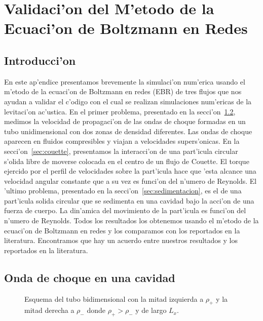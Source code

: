 \chapter{Validaci'on del M'etodo de la Ecuaci'on de Boltzmann en Redes}



\section{Introducci'on}

En este ap'endice presentamos brevemente la simulaci'on num'erica 
usando el m'etodo de la ecuaci'on de Boltzmann en redes (EBR) de  tres
flujos que nos ayudan a validar el c'odigo con el cual se realizan simulaciones num'ericas
de la levitaci'on ac'ustica.
En el primer problema, presentado en la secci'on~\ref{sec:hugoniot}, medimos la velocidad de propagaci'on de 
las ondas de choque formadas en un tubo unidimensional con dos zonas de densidad diferentes. Las
ondas de choque aparecen en fluidos compresibles y viajan a velocidades supers'onicas.
En la secci'on~\ref{sec:couette}, presentamos la interacci'on de una part'icula circular s'olida
libre de moverse colocada en  el centro de un flujo de Couette. El torque ejercido
por el perfil de velocidades sobre la part'icula hace que 'esta alcance una velocidad
angular constante que a su vez es funci'on del n'umero de Reynolds.
El 'ultimo problema, presentado en la secci'on~\ref{sec:sedimentacion}, es el de una part'icula solida
circular que se sedimenta en una cavidad bajo la acci'on de una fuerza de cuerpo. 
La din'amica del movimiento de la part'icula
es funci'on del n'umero de Reynolds. 
Todos los resultados los obtenemos usando el m'etodo de la ecuaci'on de Boltzmann en 
redes y  los comparamos con los reportados 
en la literatura. Encontramos que hay un acuerdo entre nuestros resultados y los reportados
en la literatura.



\section{Onda de choque en una cavidad}
\label{sec:hugoniot}



\begin{figure}
\centering
\caption{\label{fig:esquema-hugoniot}
Esquema del tubo bidimensional con la mitad izquierda a $\rho_+$ y la mitad derecha a $\rho_-$
donde $\rho_+ > \rho_-$ y de largo $L_x$. }
\end{figure}



